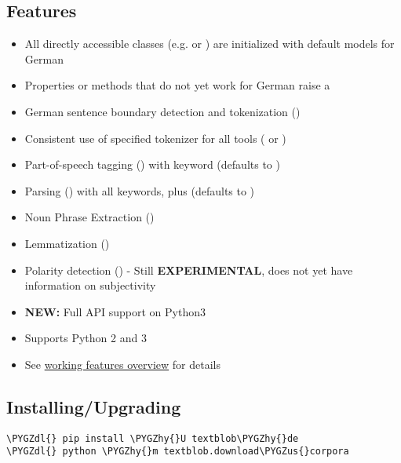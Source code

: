 \documentclass[letterpaper,10pt,english]{sphinxmanual}
\def\PYGZus{\char`\_}
\def\PYGZdl{\char`\$}
\def\PYGZhy{\char`\-}
\begin{document}
\subsection{Features}
\label{readme:features}\begin{itemize}
\item {} 
All directly accessible  classes (e.g.  or ) are initialized with default models for German

\item {} 
Properties or methods that do not yet work for German raise a 

\item {} 
German sentence boundary detection and tokenization ()

\item {} 
Consistent use of specified tokenizer for all tools ( or )

\item {} 
Part-of-speech tagging () with keyword  (defaults to )

\item {} 
Parsing () with all  keywords, plus  (defaults to )

\item {} 
Noun Phrase Extraction ()

\item {} 
Lemmatization ()

\item {} 
Polarity detection () - Still \textbf{EXPERIMENTAL}, does not yet have information on subjectivity

\item {} 
\textbf{NEW:} Full  API support on Python3

\item {} 
Supports Python 2 and 3

\item {} 
See \href{http://langui.ch/nlp/python/textblob-de-dev/}{working features overview} for details

\end{itemize}


\subsection{Installing/Upgrading}
\label{readme:installing-upgrading}
\begin{Verbatim}[commandchars=\\\{\}]
\PYGZdl{} pip install \PYGZhy{}U textblob\PYGZhy{}de
\PYGZdl{} python \PYGZhy{}m textblob.download\PYGZus{}corpora
\end{Verbatim}
\end{document}

